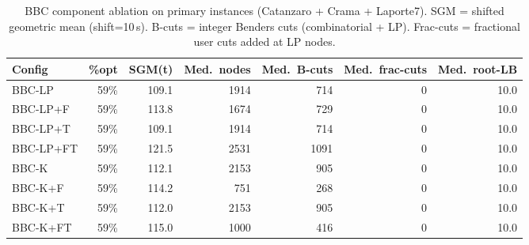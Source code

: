 \begin{table}[ht]
\centering
\small
\begin{tabular}{lrrrrrr}
\toprule
Config & \%opt & SGM(t) & Med.\ nodes & Med.\ B-cuts & Med.\ frac-cuts & Med.\ root-LB \\
\midrule
BBC-LP & 59\% & 109.1 & 1914 & 714 & 0 & 10.0 \\
BBC-LP+F & 59\% & 113.8 & 1674 & 729 & 0 & 10.0 \\
BBC-LP+T & 59\% & 109.1 & 1914 & 714 & 0 & 10.0 \\
BBC-LP+FT & 59\% & 121.5 & 2531 & 1091 & 0 & 10.0 \\
BBC-K & 59\% & 112.1 & 2153 & 905 & 0 & 10.0 \\
BBC-K+F & 59\% & 114.2 & 751 & 268 & 0 & 10.0 \\
BBC-K+T & 59\% & 112.0 & 2153 & 905 & 0 & 10.0 \\
BBC-K+FT & 59\% & 115.0 & 1000 & 416 & 0 & 10.0 \\
\bottomrule
\end{tabular}
\caption{BBC component ablation on primary instances (Catanzaro + Crama + Laporte7). SGM = shifted geometric mean (shift=10\,s). B-cuts = integer Benders cuts (combinatorial + LP). Frac-cuts = fractional user cuts added at LP nodes.}
\label{tab:bbc_ablation}
\end{table}